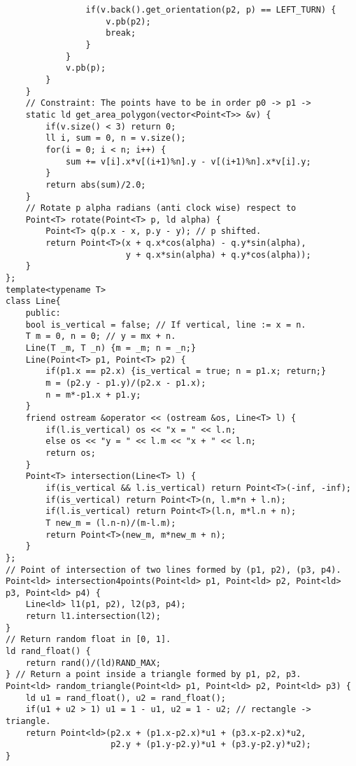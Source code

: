 \documentclass[a4paper]{article}
\begin{document}
\begin{multicols}{2}
\begin{verbatim}
                if(v.back().get_orientation(p2, p) == LEFT_TURN) {
                    v.pb(p2);
                    break;
                }
            }
            v.pb(p);
        }
    }
    // Constraint: The points have to be in order p0 -> p1 ->
    static ld get_area_polygon(vector<Point<T>> &v) {
        if(v.size() < 3) return 0;
        ll i, sum = 0, n = v.size();
        for(i = 0; i < n; i++) {
            sum += v[i].x*v[(i+1)%n].y - v[(i+1)%n].x*v[i].y;
        }
        return abs(sum)/2.0;
    }
    // Rotate p alpha radians (anti clock wise) respect to
    Point<T> rotate(Point<T> p, ld alpha) {
        Point<T> q(p.x - x, p.y - y); // p shifted.
        return Point<T>(x + q.x*cos(alpha) - q.y*sin(alpha),
                        y + q.x*sin(alpha) + q.y*cos(alpha));
    }
};
template<typename T>
class Line{
    public:
    bool is_vertical = false; // If vertical, line := x = n.
    T m = 0, n = 0; // y = mx + n.
    Line(T _m, T _n) {m = _m; n = _n;}
    Line(Point<T> p1, Point<T> p2) {
        if(p1.x == p2.x) {is_vertical = true; n = p1.x; return;}
        m = (p2.y - p1.y)/(p2.x - p1.x);
        n = m*-p1.x + p1.y;
    }
    friend ostream &operator << (ostream &os, Line<T> l) {
        if(l.is_vertical) os << "x = " << l.n;
        else os << "y = " << l.m << "x + " << l.n;
        return os;
    }
    Point<T> intersection(Line<T> l) {
        if(is_vertical && l.is_vertical) return Point<T>(-inf, -inf);
        if(is_vertical) return Point<T>(n, l.m*n + l.n);
        if(l.is_vertical) return Point<T>(l.n, m*l.n + n);
        T new_m = (l.n-n)/(m-l.m);
        return Point<T>(new_m, m*new_m + n);
    }
};
// Point of intersection of two lines formed by (p1, p2), (p3, p4).
Point<ld> intersection4points(Point<ld> p1, Point<ld> p2, Point<ld> p3, Point<ld> p4) {
    Line<ld> l1(p1, p2), l2(p3, p4);
    return l1.intersection(l2);
}
// Return random float in [0, 1].
ld rand_float() {
    return rand()/(ld)RAND_MAX;
} // Return a point inside a triangle formed by p1, p2, p3.
Point<ld> random_triangle(Point<ld> p1, Point<ld> p2, Point<ld> p3) {
    ld u1 = rand_float(), u2 = rand_float();
    if(u1 + u2 > 1) u1 = 1 - u1, u2 = 1 - u2; // rectangle -> triangle.
    return Point<ld>(p2.x + (p1.x-p2.x)*u1 + (p3.x-p2.x)*u2,
                     p2.y + (p1.y-p2.y)*u1 + (p3.y-p2.y)*u2);
}
\end{verbatim}
\end{multicols}
\end{document}
